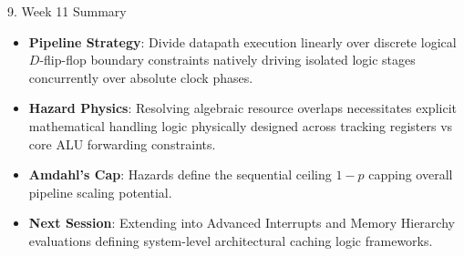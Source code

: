 \documentclass[aspectratio=169]{beamer}
\begin{document}
\begin{frame}{9. Week 11 Summary}
\begin{itemize}
    \item \textbf{Pipeline Strategy}: Divide datapath execution linearly over discrete logical $D$-flip-flop boundary constraints natively driving isolated logic stages concurrently over absolute clock phases.
    \item \textbf{Hazard Physics}: Resolving algebraic resource overlaps necessitates explicit mathematical handling logic physically designed across tracking registers vs core ALU forwarding constraints.
    \item \textbf{Amdahl's Cap}: Hazards define the sequential ceiling $1-p$ capping overall pipeline scaling potential.
    \item \textbf{Next Session}: Extending into Advanced Interrupts and Memory Hierarchy evaluations defining system-level architectural caching logic frameworks.
\end{itemize}
\end{frame}
\end{document}

